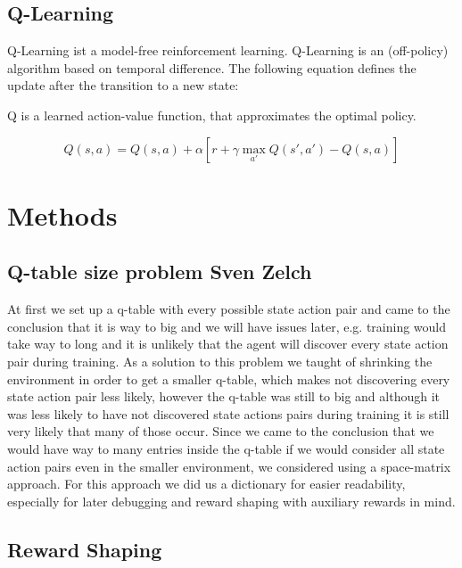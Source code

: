 \documentclass[
	letterpaper, %
	12pt, %
]{CSUniSchoolLabReport}
\begin{document}
\subsection{Q-Learning \AB}
Q-Learning ist a model-free reinforcement learning.
Q-Learning is an (off-policy) algorithm based on temporal difference.
The following equation
defines the update after the transition to a new state:

Q is a learned action-value function, that approximates the
optimal policy.

\[Q(s,a) = Q(s,a) + \alpha[r + \gamma \max_{a'} Q(s', a') - Q(s,a)] \]


\section{Methods}

\subsection{Q-table size problem \tiny Sven Zelch}
	
	At first we set up a q-table with every possible state action pair and came to the conclusion that it is way to big and we will have issues later, e.g. training would take way to long and it is unlikely that the agent will discover every state action pair during training.
	As a solution to this problem we taught of shrinking the environment in order to get a smaller q-table, which makes not discovering every state action pair less likely, however the q-table was still to big and although it was less likely to have not discovered state actions pairs during training it is still very likely that many of those occur.  
	Since we came to the conclusion that we would have way to many entries inside the q-table if we would consider all state action pairs even in the smaller environment, we considered using a space-matrix approach.
	For this approach we did us a dictionary for easier readability, especially for later debugging and reward shaping with auxiliary rewards in mind.

\subsection{Reward Shaping}
\end{document}
